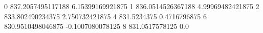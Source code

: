 0 837.2057495117188 6.15399169921875
1 836.0514526367188 4.99969482421875
2 833.802490234375 2.750732421875
4 831.5234375 0.4716796875
6 830.9510498046875 -0.1007080078125
8 831.0517578125 0.0
